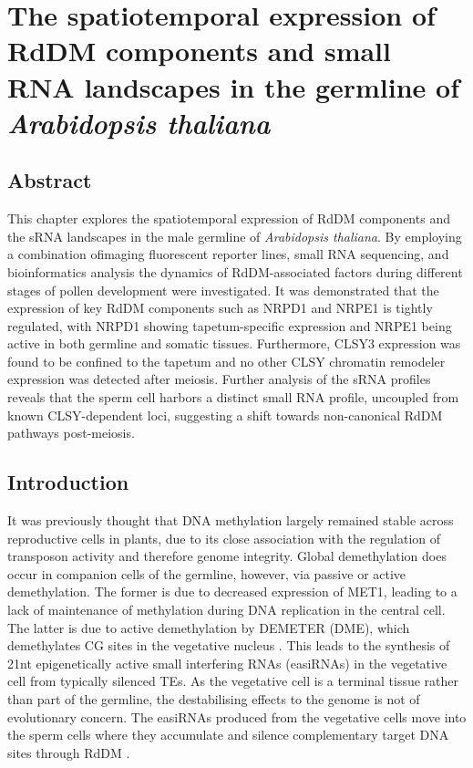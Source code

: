 
\chapter{The spatiotemporal expression of RdDM components and small RNA landscapes in the germline of \textit{Arabidopsis thaliana}}

\ifpdf
    \graphicspath{{Chapter2/Figs/Raster/}{Chapter2/Figs/PDF/}{Chapter2/Figs/}}
\else
    \graphicspath{{Chapter2/Figs/Vector/}{Chapter2/Figs/}}
\fi

\section{Abstract}

This chapter explores the spatiotemporal expression of RdDM components and the sRNA landscapes in the male germline of \textit{Arabidopsis thaliana}. By employing a combination ofimaging fluorescent reporter lines, small RNA sequencing, and bioinformatics analysis the dynamics of RdDM-associated factors during different stages of pollen development were investigated. It was demonstrated that the expression of key RdDM components such as NRPD1 and NRPE1 is tightly regulated, with NRPD1 showing tapetum-specific expression and NRPE1 being active in both germline and somatic tissues. Furthermore, CLSY3 expression was found to be confined to the tapetum and no other CLSY chromatin remodeler expression was detected after meiosis. Further analysis of the sRNA profiles reveals that the sperm cell harbors a distinct small RNA profile, uncoupled from known CLSY-dependent loci, suggesting a shift towards non-canonical RdDM pathways post-meiosis. 

\section{Introduction}

It was previously thought that DNA methylation largely remained stable across reproductive cells in plants, due to its close association with the regulation of transposon activity \cite{RN247} and therefore genome integrity. Global demethylation does occur in companion cells of the germline, however, via passive or active demethylation. The former is due to decreased expression of MET1, leading to a lack of maintenance of methylation during DNA replication in the central cell. The latter is due to active demethylation by DEMETER (DME), which demethylates CG sites in the vegetative nucleus \cite{RN235,RN57}. This leads to the synthesis of 21nt epigenetically active small interfering RNAs (easiRNAs) in the vegetative cell from typically silenced TEs. As the vegetative cell is a terminal tissue rather than part of the germline, the destabilising effects to the genome is not of evolutionary concern. The easiRNAs produced from the vegetative cells move into the sperm cells where they accumulate and silence complementary target DNA sites through RdDM \cite{RN14,RN16}.

